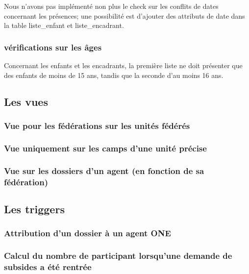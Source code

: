Nous n'avons pas implémenté non plus le check sur les conflits de dates concernant les présences; une possibilité est d'ajouter des attributs de date dans la table liste\_enfant et liste\_encadrant.

\subsubsection{vérifications sur les âges}
Concernant les enfants et les encadrants, la première liste ne doit présenter que des enfants de moins de 15 ans, tandis que la seconde d'au moins 16 ans.



\subsection{Les vues}

\subsubsection{Vue pour les fédérations sur les unités fédérés}

\subsubsection{Vue uniquement sur les camps d'une unité précise}



\subsubsection{Vue sur les dossiers d'un agent (en fonction de sa fédération)}








\subsection{Les triggers}
\subsubsection{Attribution d'un dossier à un agent ONE}

\subsubsection{Calcul du nombre de participant lorsqu'une demande de subsides a été rentrée}




